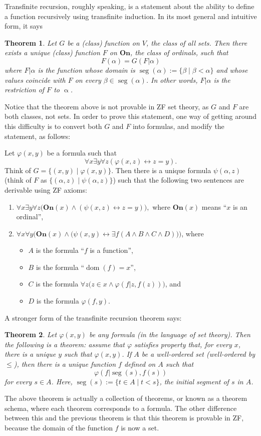 \documentclass[12pt]{article}
\newtheorem{thm}{Theorem}
\begin{document}
Transfinite recursion, roughly speaking, is a statement about the ability to define a function recursively using transfinite induction.  In its most general and intuitive form, it says

\begin{thm}  Let $G$ be a (class) function on $V$, the class of all sets.  Then there exists a unique (class) function $F$ on $\mathbf{On}$, the class of ordinals, such that $$F(\alpha)=G(F|\alpha)$$ where $F|\alpha$ is the function whose domain is $\operatorname{seg}(\alpha):=\lbrace \beta\mid \beta<\alpha\rbrace$ and whose values coincide with $F$ on every $\beta\in \operatorname{seg}(\alpha)$.  In other words, $F|\alpha$ is the restriction of $F$ to $\operatorname{\alpha}$.
\end{thm}

Notice that the theorem above is not provable in ZF set theory, as $G$ and $F$ are both classes, not sets.  In order to prove this statement, one way of getting around this difficulty is to convert both $G$ and $F$ into formulas, and modify the statement, as follows:

Let $\varphi(x,y)$ be a formula such that $$\forall x\exists y \forall z (\varphi(x,z)\leftrightarrow z=y).$$  Think of $G=\lbrace (x,y)\mid \varphi(x,y)\rbrace$.  Then there is a unique formula $\psi(\alpha,z)$ (think of $F$ as $\lbrace (\alpha,z)\mid \psi(\alpha,z)\rbrace$) such that the following two sentences are derivable using ZF axioms:
\begin{enumerate}
\item $\forall x\exists y \forall z \big(\mathbf{On}(x)\wedge (\psi(x,z)\leftrightarrow z=y) \big),$ where $\mathbf{On}(x)$ means ``$x$ is an ordinal'',
\item $\forall x\forall y \Big(\mathbf{On}(x)\wedge \big(\psi(x,y)\leftrightarrow \exists f (A\wedge B \wedge C \wedge D) \big) \Big)$, where 
\begin{itemize}
\item $A$ is the formula ``$f$ is a function'', 
\item $B$ is the formula ``$\operatorname{dom}(f)=x$'', 
\item $C$ is the formula $\forall z \big(z\in x \wedge \varphi(f|z,f(z))\big)$, and 
\item $D$ is the formula $\varphi(f,y)$.
\end{itemize}
\end{enumerate}

A stronger form of the transfinite recursion theorem says:
\begin{thm}  Let $\varphi(x,y)$ be any formula (in the language of set theory).  Then the following is a theorem: assume that $\varphi$ satisfies property that, for every $x$, there is a unique $y$ such that $\varphi(x,y)$.  If $A$ be a well-ordered set (well-ordered by $\le$), then there is a unique function $f$ defined on $A$ such that $$\varphi(f|\operatorname{seg}(s),f(s))$$ for every $s\in A$.  Here, $\operatorname{seg}(s):=\lbrace t\in A\mid t<s\rbrace$, the initial segment of $s$ in $A$.
\end{thm}

The above theorem is actually a collection of theorems, or known as a theorem schema, where each theorem corresponds to a formula.  The other difference between this and the previous theorem is that this theorem is provable in ZF, because the domain of the function $f$ is now a set.
\end{document}
